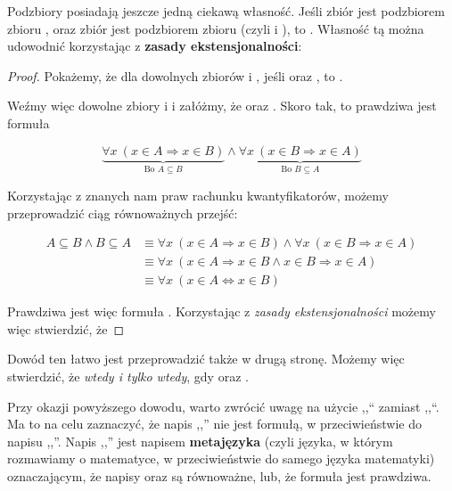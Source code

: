 Podzbiory posiadają jeszcze jedną ciekawą własność. Jeśli zbiór  jest podzbiorem zbioru , oraz zbiór  jest podzbiorem zbioru  (czyli  i ), to . Własność tą można udowodnić korzystając z \textbf{zasady ekstensjonalności}:

\begin{proof}
Pokażemy, że dla dowolnych zbiorów  i , jeśli  oraz , to .

Weźmy więc dowolne zbiory  i  i załóżmy, że  oraz . Skoro tak, to prawdziwa jest formuła

\[
\underbrace{\forall{x}\ (x \in A \Rightarrow x \in B)}_{\text{Bo } A \subseteq B} \wedge \underbrace{\forall{x}\ (x \in B \Rightarrow x \in A)}_{\text{Bo } B \subseteq A}
\]

Korzystając z znanych nam praw rachunku kwantyfikatorów, możemy przeprowadzić ciąg równoważnych przejść:

\[
\begin{split}
    A \subseteq B \wedge B \subseteq A
    & \equiv \forall{x}\ (x \in A \Rightarrow x \in B) \wedge \forall{x}\ (x \in B \Rightarrow x \in A) 
    \\& \equiv \forall{x}\ (x \in A \Rightarrow x \in B \wedge x \in B \Rightarrow x \in A) 
    \\& \equiv \forall{x}\ (x \in A \Leftrightarrow x \in B)
\end{split}
\]

Prawdziwa jest więc formuła . Korzystając z \textit{zasady ekstensjonalności} możemy więc stwierdzić, że 
\end{proof}

Dowód ten łatwo jest przeprowadzić także w drugą stronę. Możemy więc stwierdzić, że  \textit{wtedy i tylko wtedy}, gdy  oraz .

Przy okazji powyższego dowodu, warto zwrócić uwagę na użycie ,,\m{\equiv}`` zamiast ,,\m{\Leftrightarrow}``. Ma to na celu zaznaczyć, że napis ,,'' nie jest formułą, w przeciwieństwie do napisu ,,''. Napis ,,'' jest napisem \textbf{metajęzyka} (czyli języka, w którym rozmawiamy o matematyce, w przeciwieństwie do samego języka matematyki) oznaczającym, że napisy  oraz  są równoważne, lub, że formuła  jest prawdziwa. 

